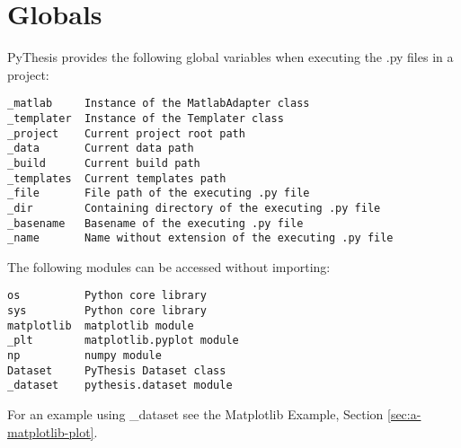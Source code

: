 \section{Globals}
\label{sec:globals}
PyThesis provides the following global variables when executing the .py files in a project:
\begin{verbatim}
_matlab     Instance of the MatlabAdapter class
_templater  Instance of the Templater class 
_project    Current project root path
_data       Current data path 
_build      Current build path 
_templates  Current templates path 
_file       File path of the executing .py file 
_dir        Containing directory of the executing .py file 
_basename   Basename of the executing .py file 
_name       Name without extension of the executing .py file 
\end{verbatim}

The following modules can be accessed without importing:
\begin{verbatim}
os          Python core library
sys         Python core library
matplotlib  matplotlib module
_plt        matplotlib.pyplot module
np          numpy module
Dataset     PyThesis Dataset class
_dataset    pythesis.dataset module
\end{verbatim}
For an example using \_dataset see the Matplotlib Example, Section \ref{sec:a-matplotlib-plot}.
